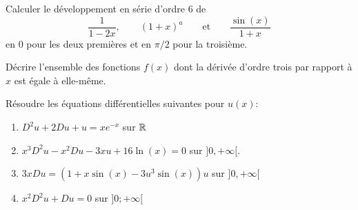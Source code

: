 \begin{exercice}
    Calculer le développement en série d'ordre 6 de
\[
    \frac{1}{1-2x},\qquad
    (1+x)^a\qquad\text{et}\qquad
    \frac{\sin(x)}{1+x}
\]
en $0$ pour les deux premières et en $\pi/2$ pour la troisième.
\end{exercice}

\begin{exercice}
     Décrire l'ensemble des fonctions $f(x)$ dont la dérivée d'ordre trois par
     rapport à $x$ est égale à elle-même. 
\end{exercice}

\begin{exercice}
    R\'{e}soudre les \'{e}quations diff\'{e}rentielles suivantes pour $u(x)$:
\begin{enumerate}[(1)]
\item $D^2u+2Du+u=xe^{-x}$ sur $\mathbb{R}$
\item $x^3D^2u-x^2Du-3xu+16\ln(x)=0$ sur $]0,+\infty[$.
\item $3xDu=(1+x\sin(x)-3u^{3}\sin(x))u$\; sur $]0,+\infty[$
\item $x^2 D^2u + Du =0$ sur $]0;+\infty[$
\end{enumerate} 
\end{exercice}


